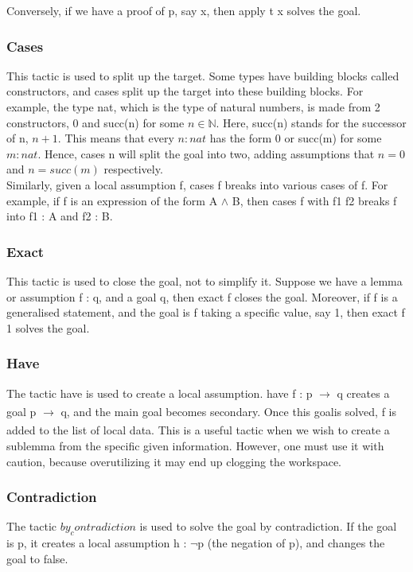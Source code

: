 \documentclass[10pt, a4paper]{article}
\begin{document}
Conversely, if we have a proof of p, say x, then apply t x solves the goal.

\subsubsection{Cases}
This tactic is used to split up the target. Some types have building blocks called constructors, and cases split up the target into these building blocks. For example, the type nat, which is the type of natural numbers, is made from 2 constructors, 0 and succ(n) for some $n \in \mathbb{N}$. Here, succ(n) stands for the successor of n, $n+1$. This means that every $n : nat$ has the form 0 or succ(m) for some $m : nat$. Hence, cases n will split the goal into two, adding assumptions that $n=0$ and $n=succ(m)$ respectively. \\

Similarly, given a local assumption f, cases f breaks into various cases of f. For example, if f is an expression of the form A $\wedge$ B, then cases f with f1 f2 breaks f into f1 : A and f2 : B.

\subsubsection{Exact}
This tactic is used to close the goal, not to simplify it. Suppose we have a lemma or assumption f : q, and a goal q, then exact f closes the goal. Moreover, if f is a generalised statement, and the goal is f taking a specific value, say 1, then exact f 1 solves the goal. 

\subsubsection{Have}
The tactic have is used to create a local assumption. have f : p $\xrightarrow[]{}$ q creates a goal p $\xrightarrow[]{}$ q, and the main goal becomes secondary. Once this goalis solved, f is added to the list of local data. This is a useful tactic when we wish to create a sublemma from the specific given information. However, one must use it with caution, because overutilizing it may end up clogging the workspace.

\subsubsection{Contradiction}
The tactic $by_contradiction$ is used to solve the goal by contradiction. If the goal is p, it creates a local assumption h : $\lnot$p (the negation of p), and changes the goal to false. \\
\end{document}
